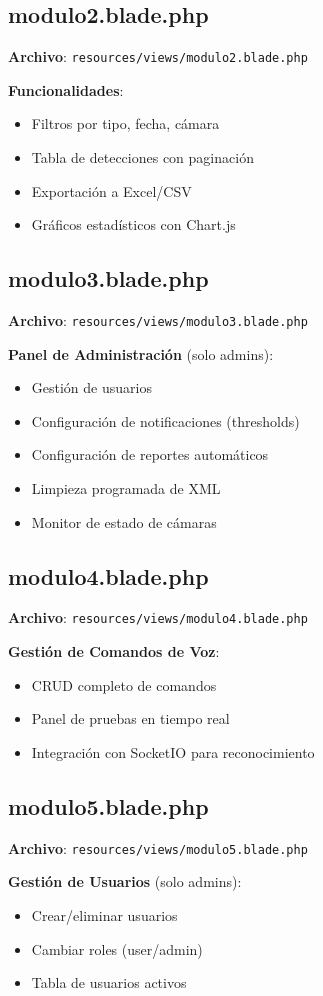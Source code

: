 \subsection{modulo2.blade.php}

\textbf{Archivo}: \texttt{resources/views/modulo2.blade.php}

\textbf{Funcionalidades}:
\begin{itemize}
    \item Filtros por tipo, fecha, cámara
    \item Tabla de detecciones con paginación
    \item Exportación a Excel/CSV
    \item Gráficos estadísticos con Chart.js
\end{itemize}

\subsection{modulo3.blade.php}

\textbf{Archivo}: \texttt{resources/views/modulo3.blade.php}

\textbf{Panel de Administración} (solo admins):
\begin{itemize}
    \item Gestión de usuarios
    \item Configuración de notificaciones (thresholds)
    \item Configuración de reportes automáticos
    \item Limpieza programada de XML
    \item Monitor de estado de cámaras
\end{itemize}

\subsection{modulo4.blade.php}

\textbf{Archivo}: \texttt{resources/views/modulo4.blade.php}

\textbf{Gestión de Comandos de Voz}:
\begin{itemize}
    \item CRUD completo de comandos
    \item Panel de pruebas en tiempo real
    \item Integración con SocketIO para reconocimiento
\end{itemize}

\subsection{modulo5.blade.php}

\textbf{Archivo}: \texttt{resources/views/modulo5.blade.php}

\textbf{Gestión de Usuarios} (solo admins):
\begin{itemize}
    \item Crear/eliminar usuarios
    \item Cambiar roles (user/admin)
    \item Tabla de usuarios activos
\end{itemize}

\newpage
